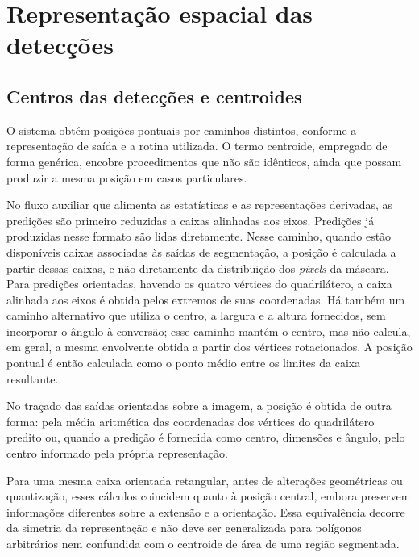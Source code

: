 \section{Representa\c{c}\~ao espacial das detec\c{c}\~oes}
\label{sec:representacao-espacial-deteccoes}

\subsection{Centros das detec\c{c}\~oes e centroides}
\label{sec:centros-deteccoes-centroides}

O sistema obt\'em posi\c{c}\~oes pontuais por caminhos distintos, conforme a representa\c{c}\~ao de sa\'ida e a rotina utilizada. O termo centroide, empregado de forma gen\'erica, encobre procedimentos que n\~ao s\~ao id\^enticos, ainda que possam produzir a mesma posi\c{c}\~ao em casos particulares.

No fluxo auxiliar que alimenta as estat\'isticas e as representa\c{c}\~oes derivadas, as predi\c{c}\~oes s\~ao primeiro reduzidas a caixas alinhadas aos eixos. Predi\c{c}\~oes j\'a produzidas nesse formato s\~ao lidas diretamente. Nesse caminho, quando est\~ao dispon\'iveis caixas associadas \`as sa\'idas de segmenta\c{c}\~ao, a posi\c{c}\~ao \'e calculada a partir dessas caixas, e n\~ao diretamente da distribui\c{c}\~ao dos \textit{pixels} da m\'ascara. Para predi\c{c}\~oes orientadas, havendo os quatro v\'ertices do quadril\'atero, a caixa alinhada aos eixos \'e obtida pelos extremos de suas coordenadas. H\'a tamb\'em um caminho alternativo que utiliza o centro, a largura e a altura fornecidos, sem incorporar o \^angulo \`a convers\~ao; esse caminho mant\'em o centro, mas n\~ao calcula, em geral, a mesma envolvente obtida a partir dos v\'ertices rotacionados. A posi\c{c}\~ao pontual \'e ent\~ao calculada como o ponto m\'edio entre os limites da caixa resultante.

No tra\c{c}ado das sa\'idas orientadas sobre a imagem, a posi\c{c}\~ao \'e obtida de outra forma: pela m\'edia aritm\'etica das coordenadas dos v\'ertices do quadril\'atero predito ou, quando a predi\c{c}\~ao \'e fornecida como centro, dimens\~oes e \^angulo, pelo centro informado pela pr\'opria representa\c{c}\~ao.

Para uma mesma caixa orientada retangular, antes de altera\c{c}\~oes geom\'etricas ou quantiza\c{c}\~ao, esses c\'alculos coincidem quanto \`a posi\c{c}\~ao central, embora preservem informa\c{c}\~oes diferentes sobre a extens\~ao e a orienta\c{c}\~ao. Essa equival\^encia decorre da simetria da representa\c{c}\~ao e n\~ao deve ser generalizada para pol\'igonos arbitr\'arios nem confundida com o centroide de \'area de uma regi\~ao segmentada.

